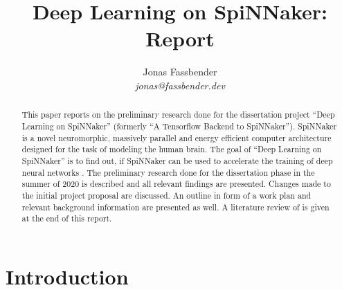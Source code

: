 \documentclass{article}
\begin{document}

\title{Deep Learning on SpiNNaker: Report}
\author{Jonas Fassbender \\ \textit{jonas@fassbender.dev}}
\date{}

\makeEPCCtitle

\newpage

\hspace{0pt}
\vfill

\begin{abstract}
This paper reports on the preliminary research done for the
dissertation project ``Deep Learning on SpiNNaker''
(formerly ``A Tensorflow Backend to SpiNNaker'').
SpiNNaker is a novel neuromorphic, massively parallel and
energy efficient computer architecture designed for the
task of modeling the human brain.
The goal of ``Deep Learning on SpiNNaker'' is to find out,
if SpiNNaker can be used to accelerate the training of
deep neural networks \citep[see e.g.][]{goodfellow2016}.
The preliminary research done for the dissertation phase
in the summer of 2020 is described and all relevant
findings are presented.
Changes made to the initial project proposal are discussed.
An outline in form of a work plan and relevant background
information are presented as well.
A literature review of \citet{nita_2018} is given at the
end of this report.
\end{abstract}

\vfill
\hspace{0pt}

\newpage

\tableofcontents

\newpage


\section{Introduction} %
\label{sec:intro}

\end{document}
